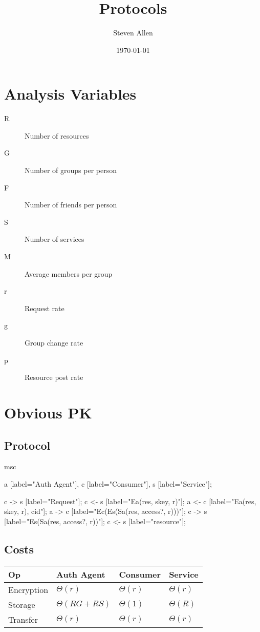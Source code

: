 \documentclass[pdftex,12pt,a4papaer]{article}
\author{Steven Allen}
\date{\today}
\title{Protocols}
\begin{document}
\maketitle

\hfill

\section{Analysis Variables}


\begin{description}
    \item[R] Number of resources
    \item[G] Number of groups per person
    \item[F] Number of friends per person
    \item[S] Number of services
    \item[M] Average members per group
    \item[r] Request rate
    \item[g] Group change rate
    \item[p] Resource post rate
\end{description}

\pagebreak

\section{Obvious PK} %

\subsection{Protocol}

\begin{msc}
msc {
    a [label="Auth Agent"],
    c [label="Consumer"],
    s [label="Service"];

    c -> s [label="Request"];
    c <- s [label="Ea(res, skey, r)"];
    a <- c [label="Ea(res, skey, r), cid"];
    a -> c [label="Ec(Es(Sa(res, access?, r)))"];
    c -> s [label="Es(Sa(res, access?, r))"];
    c <- s [label="resource"];
}
\end{msc}

\subsection{Costs}

\begin{tabular}{l|l|l|l}
 Op & Auth Agent & Consumer & Service \\ \hline
 Encryption & $\Theta(r)$ & $\Theta(r)$ & $\Theta(r)$ \\
    Storage & $\Theta(RG+RS)$ & $\Theta(1)$ & $\Theta(R)$ \\
    Transfer & $\Theta(r)$ & $\Theta(r)$ & $\Theta(r)$
\end{tabular}
\end{document}
